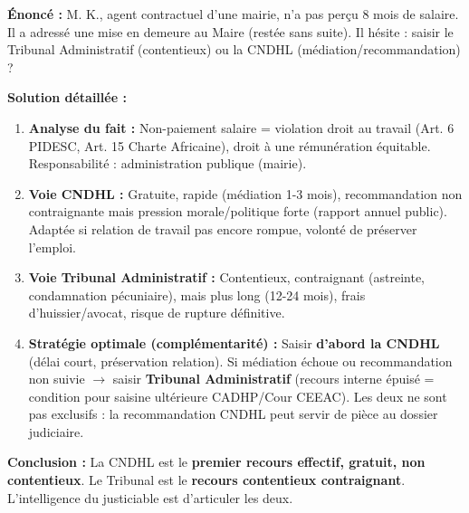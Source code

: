 \documentclass[11pt]{article}
\begin{document}
\begin{exoresolu}
\textbf{Énoncé :} M. K., agent contractuel d'une mairie, n'a pas perçu 8 mois de salaire. Il a adressé une mise en demeure au Maire (restée sans suite). Il hésite : saisir le Tribunal Administratif (contentieux) ou la CNDHL (médiation/recommandation) ?\par
\tcblower
\textbf{Solution détaillée :}
\begin{enumerate}
  \item \textbf{Analyse du fait :} Non-paiement salaire = violation droit au travail (Art. 6 PIDESC, Art. 15 Charte Africaine), droit à une rémunération équitable. Responsabilité : administration publique (mairie).
  \item \textbf{Voie CNDHL :} Gratuite, rapide (médiation 1-3 mois), recommandation non contraignante mais pression morale/politique forte (rapport annuel public). Adaptée si relation de travail pas encore rompue, volonté de préserver l'emploi.
  \item \textbf{Voie Tribunal Administratif :} Contentieux, contraignant (astreinte, condamnation pécuniaire), mais plus long (12-24 mois), frais d'huissier/avocat, risque de rupture définitive.
  \item \textbf{Stratégie optimale (complémentarité) :} Saisir \textbf{d'abord la CNDHL} (délai court, préservation relation). Si médiation échoue ou recommandation non suivie $\to$ saisir \textbf{Tribunal Administratif} (recours interne épuisé = condition pour saisine ultérieure CADHP/Cour CEEAC). Les deux ne sont pas exclusifs : la recommandation CNDHL peut servir de pièce au dossier judiciaire.
\end{enumerate}
\textbf{Conclusion :} La CNDHL est le \textbf{premier recours effectif, gratuit, non contentieux}. Le Tribunal est le \textbf{recours contentieux contraignant}. L'intelligence du justiciable est d'articuler les deux.
\end{exoresolu}
\end{document}
